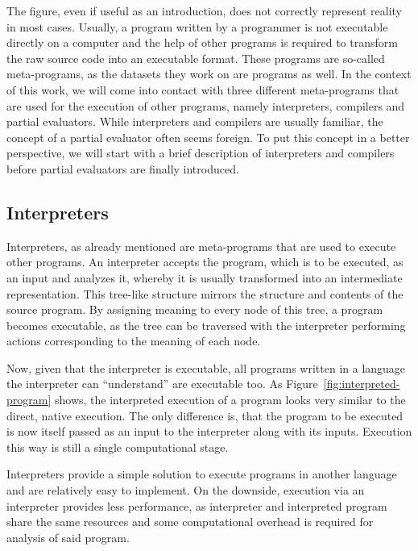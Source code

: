 The figure, even if useful as an introduction, does not correctly represent reality in most cases.
Usually, a program written by a programmer is not executable directly on a computer and the help of other programs is required to transform the raw source code into an executable format.
These programs are so-called meta-programs, as the datasets they work on are programs as well.
In the context of this work, we will come into contact with three different meta-programs that are used for the execution of other programs, namely interpreters, compilers and partial evaluators.
While interpreters and compilers are usually familiar, the concept of a partial evaluator often seems foreign.
To put this concept in a better perspective, we will start with a brief description of interpreters and compilers before partial evaluators are finally introduced.


\subsection{Interpreters}

Interpreters, as already mentioned are meta-programs that are used to execute other programs.
An interpreter accepts the program, which is to be executed, as an input and analyzes it, whereby it is usually transformed into an intermediate representation.
This tree-like structure mirrors the structure and contents of the source program.
By assigning meaning to every node of this tree, a program becomes executable, as the tree can be traversed with the interpreter performing actions corresponding to the meaning of each node.

Now, given that the interpreter is executable, all programs written in a language the interpreter can \enquote{understand} are executable too.
As Figure~\ref{fig:interpreted-program} shows, the interpreted execution of a program looks very similar to the direct, native execution.
The only difference is, that the program to be executed is now itself passed as an input to the interpreter along with its inputs.
Execution this way is still a single computational stage.

Interpreters provide a simple solution to execute programs in another language and are relatively easy to implement.
On the downside, execution via an interpreter provides less performance, as interpreter and interpreted program share the same resources and some computational overhead is required for analysis of said program.

